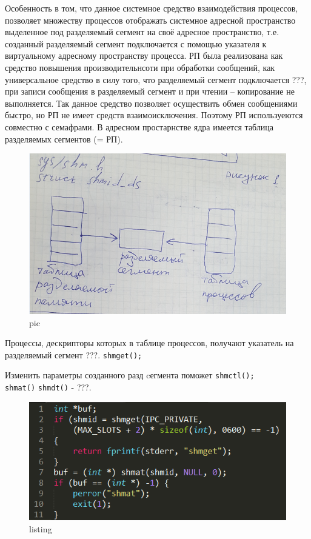 Особенность в том, что данное системное средство взаимодействия процессов, позволяет множеству процессов отображать системное адресной пространство выделенное под разделяемый сегмент на своё адресное пространство, т.е. созданный разделяемый сегмент подключается с помощью указателя к виртуальному адресному пространству процесса. РП была реализована как средство повышения производительнсоти при обработки сообщений, как универсальное средство в силу того, что разделяемый сегмент подключается ???, при записи сообщения в  разделяемый сегмент и при чтении – копирование не выполняется. Так данное средство позволяет осуществить обмен сообщениями быстро, но РП не имеет средств взаимоисключения. Поэтому РП используеются совместно с семафрами. В адресном простарнстве ядра имеется таблица разделяемых сегментов (= РП). 

\begin{figure}[H]
    \centering
    \includegraphics[width=\textwidth]{pic/1.png}
    \caption{pic}
\end{figure}

Процессы, дескрипторы которых в таблице процессов, получают указатель на разделяемый сегмент ???.
\verb|shmget();|

Изменить параметры созданного разд cегмента поможет \verb|shmctl();|\\ 
\verb|shmat()| \verb|shmdt()| - ???.

\begin{figure}[H]
    \centering
    \includegraphics[width=\textwidth]{listing/2.png}
    \caption{listing}
\end{figure}

